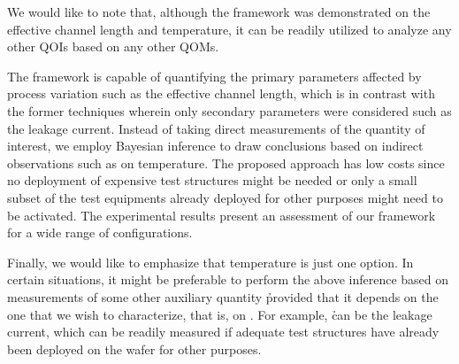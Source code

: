 We would like to note that, although the framework was demonstrated on the
effective channel length and temperature, it can be readily utilized to analyze
any other \acp{QOI} based on any other \acp{QOM}.

The framework is capable of quantifying the primary parameters affected by
process variation such as the effective channel length, which is in contrast
with the former techniques wherein only secondary parameters were considered
such as the leakage current. Instead of taking direct measurements of the
quantity of interest, we employ Bayesian inference to draw conclusions based on
indirect observations such as on temperature. The proposed approach has low
costs since no deployment of expensive test structures might be needed or only a
small subset of the test equipments already deployed for other purposes might
need to be activated. The experimental results present an assessment of our
framework for a wide range of configurations.

Finally, we would like to emphasize that temperature is just one option. In
certain situations, it might be preferable to perform the above inference based
on measurements of some other auxiliary quantity \h provided that it depends on
the one that we wish to characterize, that is, on \g. For example, \h can be the
leakage current, which can be readily measured if adequate test structures have
already been deployed on the wafer for other purposes.
